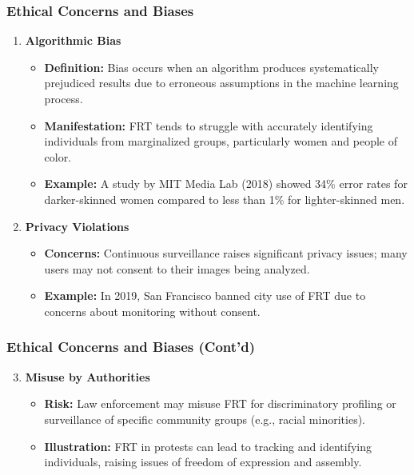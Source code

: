 \documentclass[aspectratio=169]{beamer}
\begin{document}
\begin{frame}[fragile]
    \frametitle{Ethical Concerns and Biases}
    \begin{enumerate}
        \item \textbf{Algorithmic Bias}
        \begin{itemize}
            \item \textbf{Definition:} Bias occurs when an algorithm produces systematically prejudiced results due to erroneous assumptions in the machine learning process.
            \item \textbf{Manifestation:} FRT tends to struggle with accurately identifying individuals from marginalized groups, particularly women and people of color.
            \item \textbf{Example:} A study by MIT Media Lab (2018) showed 34\% error rates for darker-skinned women compared to less than 1\% for lighter-skinned men.
        \end{itemize}
        \item \textbf{Privacy Violations}
        \begin{itemize}
            \item \textbf{Concerns:} Continuous surveillance raises significant privacy issues; many users may not consent to their images being analyzed.
            \item \textbf{Example:} In 2019, San Francisco banned city use of FRT due to concerns about monitoring without consent.
        \end{itemize}
    \end{enumerate}
\end{frame}

\begin{frame}[fragile]
    \frametitle{Ethical Concerns and Biases (Cont'd)}
    \begin{enumerate}
        \setcounter{enumi}{2}
        \item \textbf{Misuse by Authorities}
        \begin{itemize}
            \item \textbf{Risk:} Law enforcement may misuse FRT for discriminatory profiling or surveillance of specific community groups (e.g., racial minorities).
            \item \textbf{Illustration:} FRT in protests can lead to tracking and identifying individuals, raising issues of freedom of expression and assembly.
        \end{itemize}
    \end{enumerate}
\end{frame}
\end{document}
